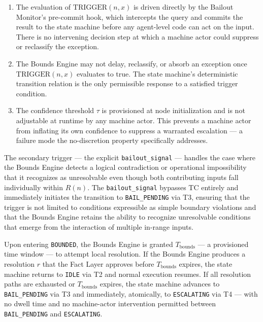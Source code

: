 \begin{enumerate}\itemsep=0pt
\item The evaluation of $\text{TRIGGER}(n, x)$ is driven directly by the Bailout Monitor's pre-commit hook, which intercepts the query and commits the result to the state machine before any agent-level code can act on the input. There is no intervening decision step at which a machine actor could suppress or reclassify the exception.

\item The Bounds Engine may not delay, reclassify, or absorb an exception once $\text{TRIGGER}(n, x)$ evaluates to true. The state machine's deterministic transition relation is the only permissible response to a satisfied trigger condition.

\item The confidence threshold $\tau$ is provisioned at node initialization and is not adjustable at runtime by any machine actor. This prevents a machine actor from inflating its own confidence to suppress a warranted escalation --- a failure mode the no-discretion property specifically addresses.
\end{enumerate}

The secondary trigger --- the explicit \texttt{bailout\_signal} --- handles the case where the Bounds Engine detects a logical contradiction or operational impossibility that it recognizes as unresolvable even though both contributing inputs fall individually within $R(n)$. The \texttt{bailout\_signal} bypasses TC entirely and immediately initiates the transition to \texttt{BAIL\_PENDING} via T3, ensuring that the trigger is not limited to conditions expressible as simple boundary violations and that the Bounds Engine retains the ability to recognize unresolvable conditions that emerge from the interaction of multiple in-range inputs.

Upon entering \texttt{BOUNDED}, the Bounds Engine is granted $T_{\text{bounds}}$ --- a provisioned time window --- to attempt local resolution. If the Bounds Engine produces a resolution $r$ that the Fact Layer approves before $T_{\text{bounds}}$ expires, the state machine returns to \texttt{IDLE} via T2 and normal execution resumes. If all resolution paths are exhausted or $T_{\text{bounds}}$ expires, the state machine advances to \texttt{BAIL\_PENDING} via T3 and immediately, atomically, to \texttt{ESCALATING} via T4 --- with no dwell time and no machine-actor intervention permitted between \texttt{BAIL\_PENDING} and \texttt{ESCALATING}.

